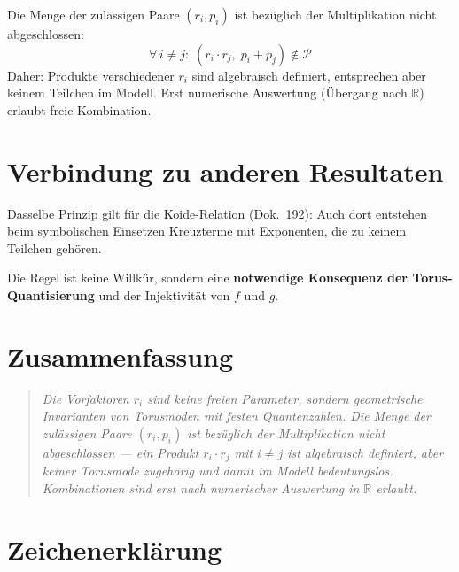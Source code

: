 \begin{tcolorbox}[colback=blue!5, colframe=blue!60!black, boxrule=0.5pt,
  arc=2pt, left=3mm, right=3mm, fontupper=\small,
  title={Grundregel --- Die Nichtabschluss-Bedingung}]
Die Menge der zulässigen Paare $(r_i, p_i)$ ist bezüglich der
Multiplikation nicht abgeschlossen:
\[
  \boxed{\forall\, i \neq j:\; (r_i \cdot r_j,\; p_i + p_j) \notin \mathcal{P}}
\]
Daher: Produkte verschiedener $r_i$ sind algebraisch definiert,
entsprechen aber keinem Teilchen im Modell.
Erst numerische Auswertung (Übergang nach $\mathbb{R}$) erlaubt
freie Kombination.
\end{tcolorbox}

\section{Verbindung zu anderen Resultaten}

Dasselbe Prinzip gilt für die Koide-Relation (Dok.~192):
Auch dort entstehen beim symbolischen Einsetzen Kreuzterme mit
Exponenten, die zu keinem Teilchen gehören.

Die Regel ist keine Willkür, sondern eine \textbf{notwendige
Konsequenz der Torus-Quantisierung} und der Injektivität von
$f$ und $g$.

\section*{Zusammenfassung}

\begin{quote}
\emph{Die Vorfaktoren $r_i$ sind keine freien Parameter, sondern
geometrische Invarianten von Torusmoden mit festen Quantenzahlen.
Die Menge der zulässigen Paare $(r_i, p_i)$ ist bezüglich der
Multiplikation nicht abgeschlossen --- ein Produkt $r_i \cdot r_j$
mit $i \neq j$ ist algebraisch definiert, aber keiner Torusmode zugehörig
und damit im Modell bedeutungslos. Kombinationen sind erst nach
numerischer Auswertung in $\mathbb{R}$ erlaubt.}
\end{quote}

\section*{Zeichenerklärung}

